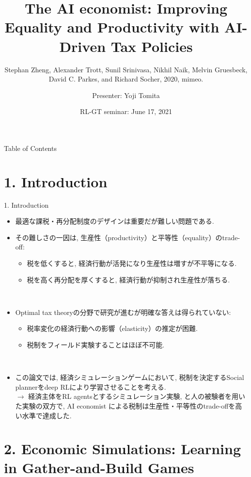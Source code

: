\documentclass[unicode,aspectratio=169,11pt]{beamer}
\title{
    The AI economist:
    Improving Equality and Productivity with AI-Driven Tax Policies
}
\subtitle{Stephan Zheng, Alexander Trott, Sunil Srinivasa, Nikhil Naik, Melvin Gruesbeck, David C. Parkes, and Richard Socher, 2020, mimeo.}
\author{Presenter: Yoji Tomita}
\date{RL-GT seminar: June 17, 2021}
\begin{document}
\maketitle

\begin{frame}{Table of Contents}
    \setcounter{tocdepth}{1}
    \tableofcontents
\end{frame}

\section{1. Introduction}
\begin{frame}{1. Introduction}
    \begin{itemize}
        \item 最適な課税・再分配制度のデザインは重要だが難しい問題である.
        \item その難しさの一因は, 生産性（productivity）と平等性（equality）のtrade-off:
        \begin{itemize}
            \item 税を低くすると, 経済行動が活発になり生産性は増すが不平等になる.
            \item 税を高く再分配を厚くすると, 経済行動が抑制され生産性が落ちる.
        \end{itemize}
        　\\
        \item Optimal tax theoryの分野で研究が進むが明確な答えは得られていない:
        \begin{itemize}
            \item 税率変化の経済行動への影響（elasticity）の推定が困難.
            \item 税制をフィールド実験することはほぼ不可能.
        \end{itemize}
        　\\
        \item この論文では, 経済シミュレーションゲームにおいて, 税制を決定するSocial plannerをdeep RLにより学習させることを考える.\\
        $\to$ 経済主体をRL agentsとするシミュレーション実験, と人の被験者を用いた実験の双方で, AI economist による税制は生産性・平等性のtrade-offを高い水準で達成した.
    \end{itemize}
\end{frame}

\section{2. Economic Simulations: Learning in Gather-and-Build Games}
\end{document}
